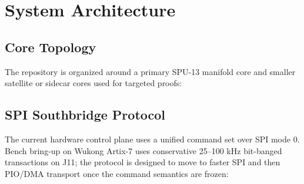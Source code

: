 \documentclass[10pt,twocolumn]{article}
\begin{document}
\section{System Architecture}
\label{sec:arch}

\subsection{Core Topology}
\label{sec:cores}

The repository is organized around a primary SPU-13 manifold core and smaller
satellite or sidecar cores used for targeted proofs:

\begin{table}[h]
\centering
{}
\caption{Processor cores.}
\end{table}

\subsection{SPI Southbridge Protocol}
\label{sec:spi}

The current hardware control plane uses a unified command set over SPI mode 0.
Bench bring-up on Wukong Artix-7 uses conservative 25--100 kHz bit-banged
transactions on J11; the protocol is designed to move to faster SPI and then
PIO/DMA transport once the command semantics are frozen:

\begin{table}[h]
\centering
{}
\caption{SPI southbridge command set.}
\end{table}
\end{document}
